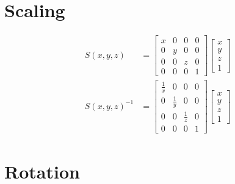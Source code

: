 \section{Scaling}

  \begin{align}
    S\left( x, y, z \right) &=
    \begin{bmatrix}
      x & 0 & 0 & 0 \\
      0 & y & 0 & 0 \\
      0 & 0 & z & 0 \\
      0 & 0 & 0 & 1
    \end{bmatrix}
    \begin{bmatrix}
      x \\
      y \\
      z \\
      1
    \end{bmatrix} \\
    S\left( x, y, z \right)^{-1} &=
    \begin{bmatrix}
      \frac{1}{x} & 0 & 0 & 0 \\
      0 & \frac{1}{y} & 0 & 0 \\
      0 & 0 & \frac{1}{z} & 0 \\
      0 & 0 & 0 & 1
    \end{bmatrix}
    \begin{bmatrix}
      x \\
      y \\
      z \\
      1
    \end{bmatrix}
  \end{align}

\section{Rotation}

